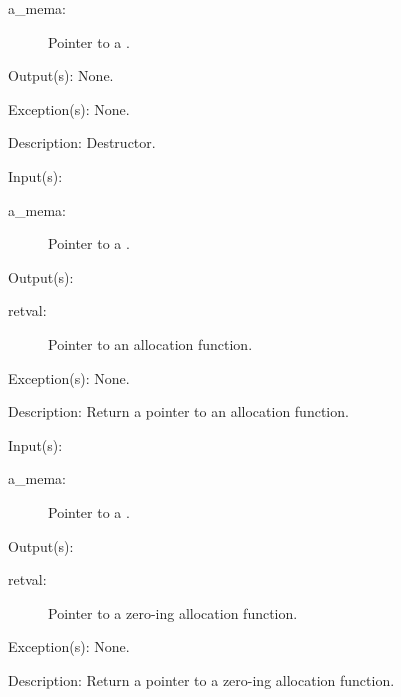 \begin{capi}
\begin{capilist}
\begin{description}
		\item[a\_mema: ]
			Pointer to a .
		\end{description}
	\item[Output(s): ] None.
	\item[Exception(s): ] None.
	\item[Description: ]
		Destructor.
	\end{capilist}
\label{mema_alloc_get}
	\begin{capilist}
	\item[Input(s): ]
		\begin{description}\item[]
		\item[a\_mema: ]
			Pointer to a .
		\end{description}
	\item[Output(s): ]
		\begin{description}\item[]
		\item[retval: ]
			Pointer to an allocation function.
		\end{description}
	\item[Exception(s): ] None.
	\item[Description: ]
		Return a pointer to an allocation function.
	\end{capilist}
\label{mema_calloc_get}
	\begin{capilist}
	\item[Input(s): ]
		\begin{description}\item[]
		\item[a\_mema: ]
			Pointer to a \classname{mema}.
		\end{description}
	\item[Output(s): ]
		\begin{description}\item[]
		\item[retval: ]
			Pointer to a zero-ing allocation function.
		\end{description}
	\item[Exception(s): ] None.
	\item[Description: ]
		Return a pointer to a zero-ing allocation function.
	\end{capilist}

\end{capi}
